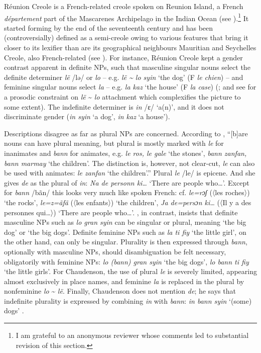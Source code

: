 \documentclass[output=paper]{langscibook}
\begin{document}
Réunion Creole is a French-related creole spoken on Reunion Island, a French \textit{département} part of the Mascarenes Archipelago in the Indian Ocean (see \citealt{Bollée2013}).\footnote{I am grateful to an anonymous reviewer whose comments led to substantial revision of this section.} It started forming by the end of the seventeenth century and has been (controversially) defined as a semi-creole owing to various features that bring it closer to its lexifier than are its geographical neighbours Mauritian and Seychelles Creole, also French-related (see \citealt{Holm2004}). For instance, Réunion Creole kept a gender contrast apparent in definite NPs, such that masculine singular nouns select the definite determiner \textit{lë} /lə/ or \textit{lo} -- e.g. \textit{lë {\textasciitilde} lo syin} ‘the dog’ (F \textit{le chien}) -- and feminine singular nouns select \textit{la} -- e.g. \textit{la kaz} ‘the house’ (F \textit{la case}) (\citealt[355, 2007]{Chaudenson1974}; and see \citet{Albers2020} for a prosodic constraint on \textit{lë} {\textasciitilde} \textit{lo} attachment which complexifies the picture to some extent). The indefinite determiner is \textit{in} /ɛ/ ‘a(n)’, and it does not discriminate gender (\textit{in syin} ‘a dog’, \textit{in kaz} ‘a house’).

Descriptions disagree as far as plural NPs are concerned. According to \citet{Bollée2013}, “[b]are nouns can have plural meaning, but plural is mostly marked with \textit{le} for inanimates and \textit{bann} for animates, e.g. \textit{le ros, le gale} ‘the stones’, \textit{bann zanfan, bann marmay} ‘the children’. The distinction is, however, not clear-cut, \textit{le} can also be used with animates: \textit{le zanfan} ‘the children’.” Plural \textit{le} /le/ is epicene. And she gives \textit{de} as the plural of \textit{in}: \textit{Na de personn ki…} ‘There are people who…’. Except for \textit{bann} /bãn/ this looks very much like spoken French: cf. \textit{le=rɔʃ} (〈les roches〉) ‘the rocks’, \textit{le=z=ãfã} (〈les enfants〉) ‘the children’, \textit{Ja de=persɔn ki…} (〈Il y a des personnes qui…〉) ‘There are people who…’. \citet[358]{Chaudenson1974}, in contrast, insists that definite masculine NPs such as \textit{lo gran syin} can be singular or plural, meaning ‘the big dog’ or ‘the big dogs’. Definite feminine NPs such as \textit{la ti fiy} ‘the little girl’, on the other hand, can only be singular. Plurality is then expressed through \textit{bann}, optionally with masculine NPs, should disambiguation be felt necessary, obligatorily with feminine NPs: \textit{lo (bann) gran syin} ‘the big dogs’, \textit{lo bann ti fiy} ‘the little girls’. For Chaudenson, the use of plural \textit{le} is severely limited, appearing almost exclusively in place names, and feminine \textit{la} is replaced in the plural by nonfeminine \textit{lo} {\textasciitilde} \textit{lë}. Finally, Chaudenson does not mention \textit{de}; he says that indefinite plurality is expressed by combining \textit{in} with \textit{bann}: \textit{in bann syin} ‘(some) dogs’ \citep[358]{Chaudenson1974}.
\end{document}
